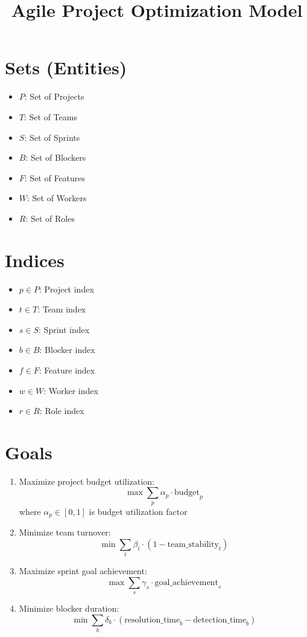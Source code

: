 \documentclass{article}
\title{Agile Project Optimization Model}
\author{}
\date{}
\begin{document}
\maketitle
\tableofcontents

\section{Sets (Entities)}
\begin{itemize}
    \item $ P $: Set of Projects
    \item $ T $: Set of Teams
    \item $ S $: Set of Sprints
    \item $ B $: Set of Blockers
    \item $ F $: Set of Features
    \item $ W $: Set of Workers
    \item $ R $: Set of Roles
\end{itemize}

\section{Indices}
\begin{itemize}
    \item $ p \in P $: Project index
    \item $ t \in T $: Team index
    \item $ s \in S $: Sprint index
    \item $ b \in B $: Blocker index
    \item $ f \in F $: Feature index
    \item $ w \in W $: Worker index
    \item $ r \in R $: Role index
\end{itemize}

\section{Goals}
\begin{enumerate}
    \item Maximize project budget utilization: 
    $$ \max \sum_{p} \alpha_p \cdot \text{budget}_p $$
    where $ \alpha_p \in [0,1] $ is budget utilization factor
    
    \item Minimize team turnover:
    $$ \min \sum_{t} \beta_t \cdot (1 - \text{team\_stability}_t) $$
    
    \item Maximize sprint goal achievement:
    $$ \max \sum_{s} \gamma_s \cdot \text{goal\_achievement}_s $$
    
    \item Minimize blocker duration:
    $$ \min \sum_{b} \delta_b \cdot (\text{resolution\_time}_b - \text{detection\_time}_b) $$
\end{enumerate}
\end{document}
